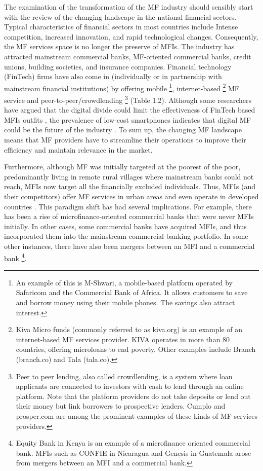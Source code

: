 \documentclass[a4paper, nobind]{templates/ociamthesis}
\begin{document}
The examination of the transformation of the MF industry should sensibly start with the review of the changing landscape in the national financial sectors. Typical characteristics of financial sectors in most countries include Intense competition, increased innovation, and rapid technological changes. Consequently, the MF services space is no longer the preserve of MFIs. The industry has attracted mainstream commercial banks, MF-oriented commercial banks, credit unions, building societies, and insurance companies. Financial technology (FinTech) firms have also come in (individually or in partnership with mainstream financial institutions) by offering mobile \footnote{An example of this is M-Shwari, a mobile-based platform operated by Safaricom and the Commercial Bank of Africa. It allows customers to save and borrow money using their mobile phones. The savings also attract interest.}, internet-based \footnote{Kiva Micro funds (commonly referred to as kiva.org) is an example of an internet-based MF services provider. KIVA operates in more than 80 countries, offering microloans to end poverty. Other examples include Branch (branch.co) and Tala (tala.co).} MF service and peer-to-peer/crowdlending \footnote{Peer to peer lending, also called crowdlending, is a system where loan applicants are connected to investors with cash to lend through an online platform. Note that the platform providers do not take deposits or lend out their money but link borrowers to prospective lenders. Cumplo and prosper.com are among the prominent examples of these kinds of MF services providers.} (Table 1.2). Although some researchers have argued that the digital divide could limit the effectiveness of FinTech based MFIs outfits \autocite{yartey2017subaltern,fd2017}, the prevalence of low-cost smartphones indicates that digital MF could be the future of the industry \autocite{yum2012wisdom}. To sum up, the changing MF landscape means that MF providers have to streamline their operations to improve their efficiency and maintain relevance in the market.

Furthermore, although MF was initially targeted at the poorest of the poor, predominantly living in remote rural villages where mainstream banks could not reach, MFIs now target all the financially excluded individuals. Thus, MFIs (and their competitors) offer MF services in urban areas and even operate in developed countries \autocite{kota2007microfinance}. This paradigm shift has had several implications. For example, there has been a rise of microfinance-oriented commercial banks that were never MFIs initially. In other cases, some commercial banks have acquired MFIs, and thus incorporated them into the mainstream commercial banking portfolio. In some other instances, there have also been mergers between an MFI and a commercial bank \footnote{Equity Bank in Kenya is an example of a microfinance oriented commercial bank. MFIs such as CONFIE in Nicaragua and Genesis in Guatemala arose from mergers between an MFI and a commercial bank.}.
\end{document}
